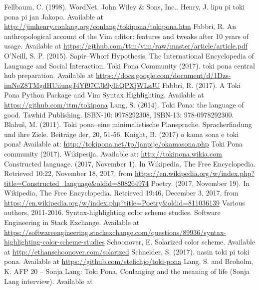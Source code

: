 \documentclass{article}
\begin{document}
\begin{thebibliography}{99}
\fontsize{11}{0}\selectfont
{}
  Fellbaum, C. (1998). WordNet. John Wiley \& Sons, Inc..
    Henry, J. lipu pi toki pona pi jan Jakopo. Available at         
    \url{http://jimhenry.conlang.org/conlang/tokipona/tokipona.htm} 
    Fabbri, R. An anthropological account of the Vim editor:
features and tweaks after 10 years of usage. Available at         
    \url{https://github.com/ttm/vim/raw/master/article/article.pdf} 
  O'Neill, S. P. (2015). Sapir–Whorf Hypothesis. The International
    Encyclopedia of Language and Social Interaction.
  Toki Pona Community (2017). toki pona central hub preparation.
    Available at
    \url{https://docs.google.com/document/d/1Dzs-imNeZ8TMgdHUiiungJ4Yf97CJk9ylhQPXjWLsJU}
	Fabbri, R. (2017). A Toki Pona Python Package and Vim Syntax Highlighting. Available at \url{https://github.com/ttm/tokipona} 
	Lang, S. (2014). Toki Pona: the language of good. Tawhid Publishing.
    ISBN-10: 0978292308, ISBN-13: 978-0978292300.
  Blahuš, M. (2011). Toki pona–eine minimalistische Plansprache.
    Spracherfindung und ihre Ziele. Beiträge der, 20, 51-56.
  Knight, B. (2017) o kama sona e toki pona! Available at:
    \url{http://tokipona.net/tp/janpije/okamasona.php}
  Toki Pona community (2017). Wikipesija. Available at:
    \url{http://tokipona.wikia.com}
  Constructed language. (2017, November 1). In Wikipedia, The Free Encyclopedia. Retrieved 10:22, November 18, 2017, from \url{https://en.wikipedia.org/w/index.php?title=Constructed_language&oldid=808264974}
Poetry. (2017, November 19). In Wikipedia, The Free Encyclopedia.
    Retrieved 19:46, December 3, 2017, from
    \url{https://en.wikipedia.org/w/index.php?title=Poetry&oldid=811036139}
  Various authors, 2011-2016. Syntax-highlighting color scheme studies.
    Software Engineering in Stack Exchange. Available at
    \url{https://softwareengineering.stackexchange.com/questions/89936/syntax-highlighting-color-scheme-studies}
  Schoonover, E. Solarized color scheme. Available at
  \url{http://ethanschoonover.com/solarized}
  Schneider, S. (2017). nasin toki pi toki pona. Available at
  \url{https://github.com/stefichjo/toki-pona}
  Lang, S. and Broholm, K. AFP 20 – Sonja Lang: Toki Pona, Conlanging
    and the meaning of life (Sonja Lang interview). Available at

\end{thebibliography}
\end{document}
